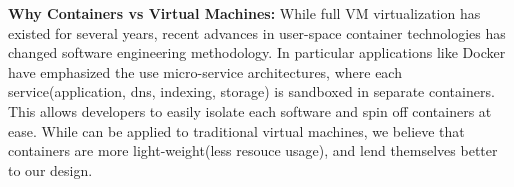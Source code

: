 \noindent
\textbf{Why Containers vs Virtual Machines:} 
While full VM virtualization has existed for several years, recent advances in user-space container technologies has changed software engineering methodology. 
In particular applications like Docker\cite{docker} have emphasized the use micro-service architectures, where each service(application, dns, indexing, storage) is sandboxed in separate containers. 
This allows developers to easily isolate each software and spin off containers at ease.
While \parikshan can be applied to traditional virtual machines, we believe that containers are more light-weight(less resouce usage), and lend themselves better to our design.


